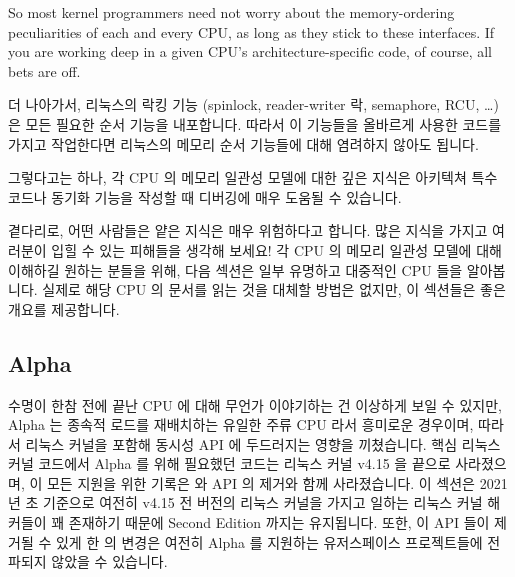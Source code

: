 So most kernel programmers need not worry about the memory-ordering
peculiarities of each and every CPU, as long as they stick to these
interfaces.
If you are working deep in a given CPU's architecture-specific code,
of course, all bets are off.

\fi

더 나아가서, 리눅스의 락킹 기능 (spinlock, reader-writer 락, semaphore, RCU,
\ldots) 은 모든 필요한 순서 기능을 내포합니다.
따라서 이 기능들을 올바르게 사용한 코드를 가지고 작업한다면 리눅스의 메모리
순서 기능들에 대해 염려하지 않아도 됩니다.

그렇다고는 하나, 각 CPU 의 메모리 일관성 모델에 대한 깊은 지식은 아키텍쳐 특수
코드나 동기화 기능을 작성할 때 디버깅에 매우 도움될 수 있습니다.

곁다리로, 어떤 사람들은 얕은 지식은 매우 위험하다고 합니다.
많은 지식을 가지고 여러분이 입힐 수 있는 피해들을 생각해 보세요!
각 CPU 의 메모리 일관성 모델에 대해 이해하길 원하는 분들을 위해, 다음 섹션은
일부 유명하고 대중적인 CPU 들을 알아봅니다.
실제로 해당 CPU 의 문서를 읽는 것을 대체할 방법은 없지만, 이 섹션들은 좋은
개요를 제공합니다.

\subsection{Alpha}
\label{sec:memorder:Alpha}

수명이 한참 전에 끝난 CPU 에 대해 무언가 이야기하는 건 이상하게 보일 수 있지만,
Alpha 는 종속적 로드를 재배치하는 유일한 주류 CPU 라서 흥미로운 경우이며,
따라서 리눅스 커널을 포함해 동시성 API 에 두드러지는 영향을 끼쳤습니다.
핵심 리눅스 커널 코드에서 Alpha 를 위해 필요했던 코드는 리눅스 커널 v4.15 을
끝으로 사라졌으며, 이 모든 지원을 위한 기록은 
와  API 의 제거와 함께 사라졌습니다.
이 섹션은 2021년 초 기준으로 여전히 v4.15 전 버전의 리눅스 커널을 가지고 일하는
리눅스 커널 해커들이 꽤 존재하기 때문에 Second Edition 까지는 유지됩니다.
또한, 이 API 들이 제거될 수 있게 한  의 변경은 여전히 Alpha 를
지원하는 유저스페이스 프로젝트들에 전파되지 않았을 수 있습니다.

